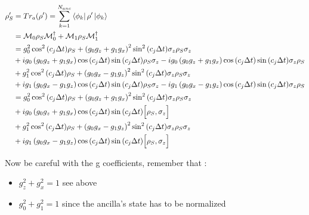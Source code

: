 \documentclass[a4paper,12pt]{article}
\begin{document}
	 \begin{align}
	 	\rho_S' & = Tr_a(\rho') = \sum_{k=1}^{N_{anc}}{\bra{\phi_k}\rho'\ket{\phi_k}} \notag \\
	 	&=\mathcal{M}_{0} \rho_S \mathcal{M}_{0}^{\dagger} + \mathcal{M}_{1} \rho_S \mathcal{M}_{1}^{\dagger} \notag \\
	 	&= g_{0}^{2} \cos^{2}{\left(c_j \Delta t \right)} \rho_S + \left(g_0 g_z + g_1 g_x \right)^{2} \sin^{2}{\left(c_j \Delta t \right)} \sigma_{z} \rho_S \sigma_{z} \notag \\
	 	& + i g_{0} \left(g_0 g_z + g_1 g_x \right) \cos{\left(c_j \Delta t \right)} \sin{\left(c_j \Delta t \right)} \rho_S \sigma_{z}
	 	- i g_{0} \left(g_0 g_z + g_1 g_x \right) \cos{\left(c_j \Delta t \right)} \sin{\left(c_j \Delta t \right)} \sigma_{z} \rho_S \notag \\
	 	& + g_{1}^{2} \cos^{2}{\left(c_j \Delta t \right)} \rho_S + \left(g_0 g_x - g_1 g_z \right)^{2} \sin^{2}{\left(c_j \Delta t \right)} \sigma_{z} \rho_S \sigma_{z} \notag \\
	 	& + i g_{1} \left(g_0 g_x - g_1 g_z \right) \cos{\left(c_j \Delta t \right)} \sin{\left(c_j \Delta t \right)} \rho_S \sigma_{z}
	 	- i g_{1} \left(g_0 g_x - g_1 g_z \right) \cos{\left(c_j \Delta t \right)} \sin{\left(c_j \Delta t \right)} \sigma_{z} \rho_S \notag \\
	 	&= g_{0}^{2} \cos^{2}{\left(c_j \Delta t \right)} \rho_S + \left(g_0 g_z + g_1 g_x \right)^{2} \sin^{2}{\left(c_j \Delta t \right)} \sigma_{z} \rho_S \sigma_{z} \notag \\
	 	& + i g_{0} \left(g_0 g_z + g_1 g_x \right) \cos{\left(c_j \Delta t \right)} \sin{\left(c_j \Delta t \right)} \Big[\rho_S , \sigma_{z} \Big] \notag \\
	 	& + g_{1}^{2} \cos^{2}{\left(c_j \Delta t \right)} \rho_S + \left(g_0 g_x - g_1 g_z \right)^{2} \sin^{2}{\left(c_j \Delta t \right)} \sigma_{z} \rho_S \sigma_{z} \notag \\
	 	& + i g_{1} \left(g_0 g_x - g_1 g_z \right) \cos{\left(c_j \Delta t \right)} \sin{\left(c_j \Delta t \right)} \Big[\rho_S , \sigma_{z} \Big] \notag
	 \end{align}
	  	
	 Now be careful with the g coefficients, remember that :
	  	
	 \begin{itemize}
	 	\item $ g_{z}^{2} + g_{x}^{2} = 1 $ see above
	 	\item $ g_{0}^{2} + g_{1}^{2} = 1 $ since the ancilla's state has to be normalized
	 \end{itemize}
	  	
\end{document}
